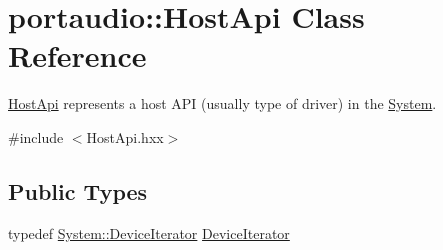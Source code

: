 \hypertarget{classportaudio_1_1_host_api}{}\section{portaudio\+:\+:Host\+Api Class Reference}
\label{classportaudio_1_1_host_api}


\hyperlink{classportaudio_1_1_host_api}{Host\+Api} represents a host A\+PI (usually type of driver) in the \hyperlink{classportaudio_1_1_system}{System}.  




{\ttfamily \#include $<$Host\+Api.\+hxx$>$}

\subsection*{Public Types}
\begin{DoxyCompactItemize}
\item 
typedef \hyperlink{classportaudio_1_1_system_1_1_device_iterator}{System\+::\+Device\+Iterator} \hyperlink{classportaudio_1_1_host_api_a17aa38607ee48a62d953550754dc4753}{Device\+Iterator}
\end{DoxyCompactItemize}
